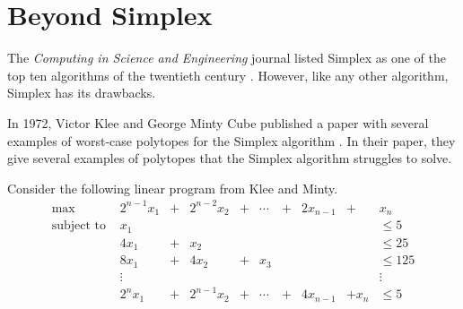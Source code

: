 
\section*{Beyond Simplex} %

The \emph{Computing in Science and Engineering} journal listed Simplex as one of the top ten algorithms of the twentieth century \cite{Nash2000}.
However, like any other algorithm, Simplex has its drawbacks.

In 1972, Victor Klee and George Minty Cube published a paper with several examples of worst-case polytopes for the Simplex algorithm \cite{Klee1972}.
In their paper, they give several examples of polytopes that the Simplex algorithm struggles to solve.

Consider the following linear program from Klee and Minty.
\begin{align*}
\text{max } & 2^{n-1}x_1 & + & 2^{n-2}x_2  & + & \cdots & + & 2x_{n-1} & + & x_n\\
\text{subject to } & x_1 &  &  &  &  &  &  &  &\leq 5\\
& 4x_1 & + & x_2 &  &  &  &  &  &\leq 25\\
& 8x_1 & + & 4x_2 & + & x_3 &  &  &  &\leq 125\\
& \vdots & &      &   &     &  &  &  &\vdots\\
& 2^n x_1 & + & 2^{n-1} x_2 & + & \cdots & + & 4x_{n-1} & + x_n &\leq 5\\
\end{align*}

